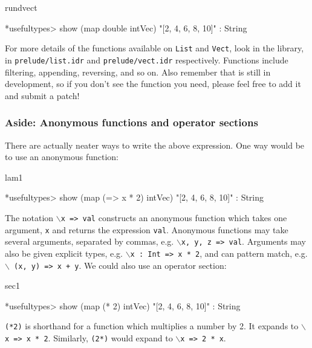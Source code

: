 \begin{SaveVerbatim}{rundvect}

*usefultypes> show (map double intVec) 
"[2, 4, 6, 8, 10]" : String

\end{SaveVerbatim}

\noindent
For more details of the functions available on \texttt{List} and \texttt{Vect},
look in the library, in \texttt{prelude/list.idr} and \texttt{prelude/vect.idr} respectively.
Functions include filtering, appending, reversing, and so on. Also remember
that \Idris{} is still in development, so if you don't see the function you
need, please feel free to add it and submit a patch!

\subsubsection*{Aside: Anonymous functions and operator sections}

There are actually neater ways to write the above expression. One way would be
to use an anonymous function:

\begin{SaveVerbatim}{lam1}

*usefultypes> show (map (\x => x * 2) intVec)
"[2, 4, 6, 8, 10]" : String

\end{SaveVerbatim}

\noindent
The notation \texttt{$\backslash$x => val} constructs an anonymous function
which takes one argument, \texttt{x} and returns the expression \texttt{val}.
Anonymous functions may take several arguments, separated by commas, e.g.
\texttt{$\backslash$x, y, z => val}. Arguments may also be given explicit
types, e.g. \texttt{$\backslash$x : Int => x * 2}, and can pattern match,
e.g. \texttt{$\backslash$ (x, y) => x + y}.
We could also use an operator section:

\begin{SaveVerbatim}{sec1}

*usefultypes> show (map (* 2) intVec)
"[2, 4, 6, 8, 10]" : String

\end{SaveVerbatim}

\noindent
\texttt{(*2)} is shorthand for a function which multiplies a number by 2. It expands to
\texttt{$\backslash$x => x * 2}. 
Similarly, \texttt{(2*)} would expand to \texttt{$\backslash$x => 2 * x}.

